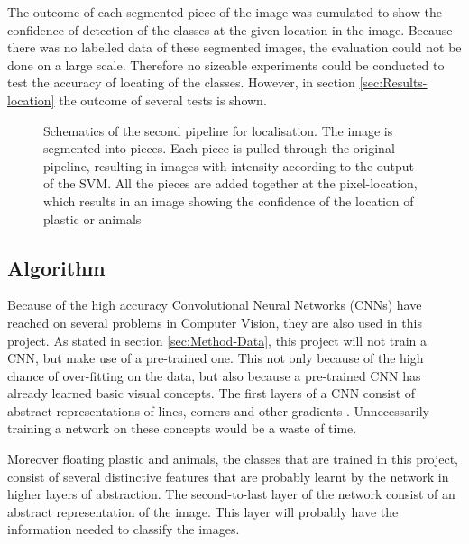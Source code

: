 The outcome of each segmented piece of the image was cumulated to show the confidence of detection of the classes at the given location in the image.
Because there was no labelled data of these segmented images, the evaluation could not be done on a large scale.
Therefore no sizeable experiments could be conducted to test the accuracy of locating of the classes.
However, in section \ref{sec:Results-location} the outcome of several tests is shown.

\begin{figure}%
\centering
\ifx\showfig\undefined

\fi
\caption{Schematics of the second pipeline for localisation. The image is segmented into pieces. Each piece is pulled through the original pipeline, resulting in images with intensity according to the output of the SVM. All the pieces are added together at the pixel-location, which results in an image showing the confidence of the location of plastic or animals}
\label{fig:locpip}
\end{figure}









\iffalse
\subsection{Algorithm}
\label{sec:Method-algotihm}
Because of the high accuracy Convolutional Neural Networks (CNNs) have reached on several problems in Computer Vision, they are also used in this project.
As stated in section \ref{sec:Method-Data}, this project will not train a CNN, but make use of a pre-trained one.
This not only because of the high chance of over-fitting on the data, but also because a pre-trained CNN has already learned basic visual concepts.
The first layers of a CNN consist of abstract representations of lines, corners and other gradients \citep{zeiler2014visualizing}.
Unnecessarily training a network on these concepts would be a waste of time.

Moreover floating plastic and animals, the classes that are trained in this project, consist of several distinctive features that are probably learnt by the network in higher layers of abstraction.
The second-to-last layer of the network consist of an abstract representation of the image.
This layer will probably have the information needed to classify the images. \citeneed

